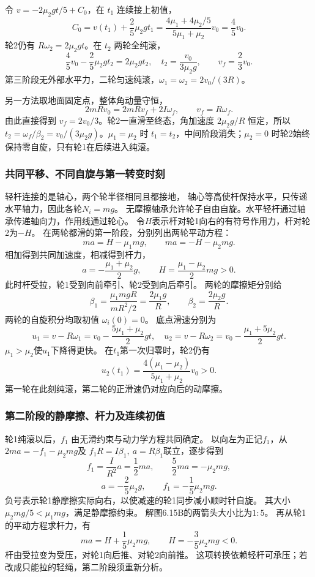 \documentclass[UTF8,fontset=fandol,a4paper,11pt]{ctexart}
\newcommand{\result}[1]{\begin{equation*}\boxed{#1}\end{equation*}}
\begin{document}
令 $v=-2\mu_2gt/5+C_0$，在 $t_1$ 连续接上初值，
\[
 C_0=v(t_1)+\frac25\mu_2gt_1
 =\frac{4\mu_1+4\mu_2/5}{5\mu_1+\mu_2}v_0=\frac45v_0.
\]
轮2仍有 $R\omega_2=2\mu_2gt$。在 $t_2$ 两轮全纯滚，
\[
 \frac45v_0-\frac25\mu_2gt_2=2\mu_2gt_2,
 \quad\result{t_2=\frac{v_0}{3\mu_2g},\qquad v_f=\frac23v_0.}
\]
第三阶段无外部水平力，二轮匀速纯滚，$\omega_1=\omega_2=2v_0/(3R)$。

另一方法取地面固定点，整体角动量守恒，
\[
 2mRv_0=2mRv_f+2I\omega_f,
 \qquad v_f=R\omega_f.
\]
由此直接得到 $v_f=2v_0/3$。轮2一直滑至终态，角加速度 $2\mu_2g/R$ 恒定，所以 $t_2=\omega_f/\beta_2=v_0/(3\mu_2g)$。$\mu_1=\mu_2$ 时 $t_1=t_2$，中间阶段消失；$\mu_2=0$ 时轮2始终保持零自旋，只有轮1在后续进入纯滚。
\subsubsection*{共同平移、不同自旋与第一转变时刻}
轻杆连接的是轴心，两个轮半径相同且都接地，
轴心等高使杆保持水平，只传递水平轴力，因此各轮$N_i=mg$。
无摩擦轴承允许轮子自由自旋。水平轻杆通过轴承传递轴向力，作用线通过轮心。
令$H$表示杆对轮1向右的有符号作用力，杆对轮2为$-H$。
在两轮都滑的第一阶段，分别列出两轮平动方程：
\[
ma=H-\mu_1mg,\qquad ma=-H-\mu_2mg.
\]
相加得到共同加速度，相减得到杆力，
\[
a=-\frac{\mu_1+\mu_2}{2}g,
\qquad H=\frac{\mu_1-\mu_2}{2}mg>0.
\]
此时杆受拉，轮1受到向前牵引、轮2受到向后牵引。
两轮的摩擦矩分别给
\[
\beta_1=\frac{\mu_1mgR}{mR^2/2}=\frac{2\mu_1g}{R},
\qquad
\beta_2=\frac{2\mu_2g}{R}.
\]
两轮的自旋积分均取初值 $\omega_i(0)=0$。
底点滑速分别为
\[
u_1=v-R\omega_1=v_0-\frac{5\mu_1+\mu_2}{2}gt,
\quad
u_2=v-R\omega_2=v_0-\frac{\mu_1+5\mu_2}{2}gt.
\]
$\mu_1>\mu_2$使$u_1$下降得更快。
在$t_1$第一次归零时，轮2仍有
\[
u_2(t_1)=\frac{4(\mu_1-\mu_2)}{5\mu_1+\mu_2}v_0>0.
\]
第一轮在此刻纯滚，第二轮的正滑速仍对应向后的动摩擦。

\subsubsection*{第二阶段的静摩擦、杆力及连续初值}
轮1纯滚以后，$f_1$ 由无滑约束与动力学方程共同确定。
以向左为正记$f_1$，从$2ma=-f_1-\mu_2mg$及
$f_1R=I\beta_1,\ a=R\beta_1$联立，逐步得到
\[
f_1=\frac{I}{R^2}a=\frac12ma,
\qquad \frac52ma=-\mu_2mg,
\]
\[
a=-\frac25\mu_2g,\qquad f_1=-\frac15\mu_2mg.
\]
负号表示轮1静摩擦实际向右，以使减速的轮1同步减小顺时针自旋。
其大小$\mu_2mg/5<\mu_1mg$，满足静摩擦约束。
解图6.15B的两箭头大小比为$1:5$。
再从轮1的平动方程求杆力，有
\[
ma=H+\frac15\mu_2mg,
\qquad H=-\frac35\mu_2mg<0.
\]
杆由受拉变为受压，对轮1向后推、对轮2向前推。
这项转换依赖轻杆可承压；若改成只能拉的轻绳，第二阶段须重新分析。
\end{document}
